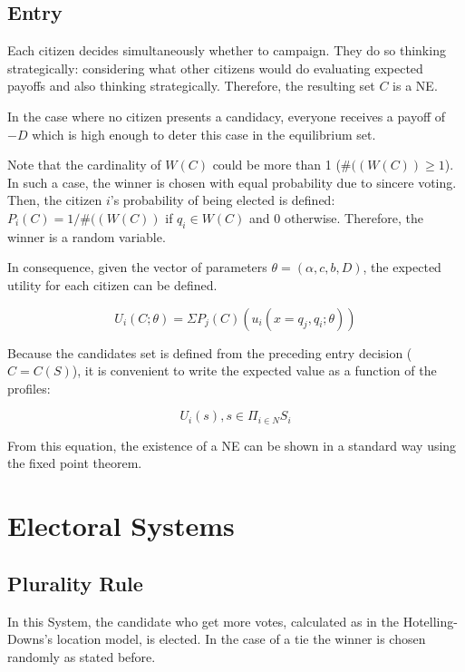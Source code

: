 	
	\subsection{Entry}
	Each citizen decides simultaneously whether to campaign.
	They do so thinking strategically: considering what other citizens would do evaluating expected payoffs and also thinking strategically. 
	Therefore, the resulting set $C$ is a NE. 
	
	In the case where no citizen presents a candidacy, everyone receives a payoff of $-D$ which is high enough to deter this case in the equilibrium set. 
	
	Note that the cardinality of $W(C)$ could be more than 1 ($\#((W(C)) \ge 1$). In such a case, the winner is chosen with equal probability due to sincere voting. Then, the citizen $i$'s probability of being elected is defined: $P_i(C)=1/\#((W(C))$ if $q_i \in W(C)$ and $0$ otherwise. 
	Therefore, the winner is a random variable.
	
	In consequence, given the vector of parameters $\theta= (\alpha, c, b, D)$, the expected utility for each citizen can be defined.
	
	\begin{equation}
	U_i( C;\theta )=\Sigma P_j(C)(u_i(x=q_j,q_i;\theta))
	\end{equation}\label{eq:EU}
	
	Because the candidates set is defined from the preceding entry decision ($C=C(S)$), it is convenient to write the expected value as a function of the profiles:
	
	$$
	U_i(s), s \in \Pi_{i \in N} S_i
	$$
	
	From this equation, the existence of a NE can be shown in a standard way using the fixed point theorem.

\section{Electoral Systems}\label{systems}
	\subsection{Plurality Rule}
	In this System, the candidate who get more votes, calculated as in the Hotelling-Downs's location model, is elected. 
	In the case of a tie the winner is chosen randomly as stated before.

